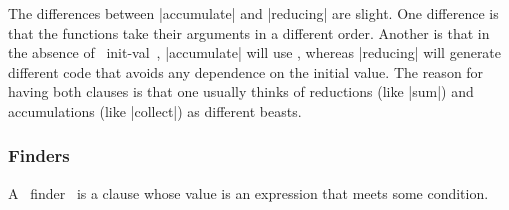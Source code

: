 \begin{clauses}

\cpar The differences between |accumulate| and |reducing| are slight.
One difference is that the functions take their arguments in a
different order.  Another is that in the absence of ~init-val~,
|accumulate| will use \nil, whereas |reducing| will generate different
code that avoids any dependence on the initial value.
The reason for having both clauses is that one usually
thinks of reductions (like |sum|) and accumulations (like |collect|)
as different beasts.

\end{clauses}


\subsubsection{Finders}

A ~finder~ is a clause whose value is an expression that meets some
condition.

